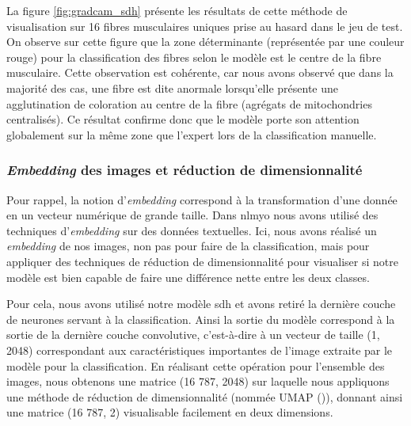 La figure \ref{fig:gradcam_sdh} présente les résultats de cette méthode de visualisation sur 16 fibres musculaires uniques prise au hasard dans le jeu de test. On observe sur cette figure que la zone déterminante (représentée par une couleur rouge) pour la classification des fibres selon le modèle est le centre de la fibre musculaire. Cette observation est cohérente, car nous avons observé que dans la majorité des cas, une fibre est dite anormale lorsqu'elle présente une agglutination de coloration au centre de la fibre (agrégats de mitochondries centralisés). Ce résultat confirme donc que le modèle porte son attention globalement sur la même zone que l'expert lors de la classification manuelle. 

\subsubsection{\textit{Embedding} des images et réduction de dimensionnalité} 
Pour rappel, la notion d'\textit{embedding} correspond à la transformation d'une donnée en un vecteur numérique de grande taille. Dans \gls{nlmyo} nous avons utilisé des techniques d'\textit{embedding} sur des données textuelles. Ici, nous avons réalisé un \textit{embedding} de nos images, non pas pour faire de la classification, mais pour appliquer des techniques de réduction de dimensionnalité pour visualiser si notre modèle est bien capable de faire une différence nette entre les deux classes.

Pour cela, nous avons utilisé notre modèle \gls{sdh} et avons retiré la dernière couche de neurones servant à la classification. Ainsi la sortie du modèle correspond à la sortie de la dernière couche convolutive, c'est-à-dire à un vecteur de taille (1, 2048) correspondant aux caractéristiques importantes de l'image extraite par le modèle pour la classification. En réalisant cette opération pour l'ensemble des images, nous obtenons une matrice (16 787, 2048) sur laquelle nous appliquons une méthode de réduction de dimensionnalité (nommée UMAP (\cite{mcinnes_umap_2020})), donnant ainsi une matrice (16 787, 2) visualisable facilement en deux dimensions.

